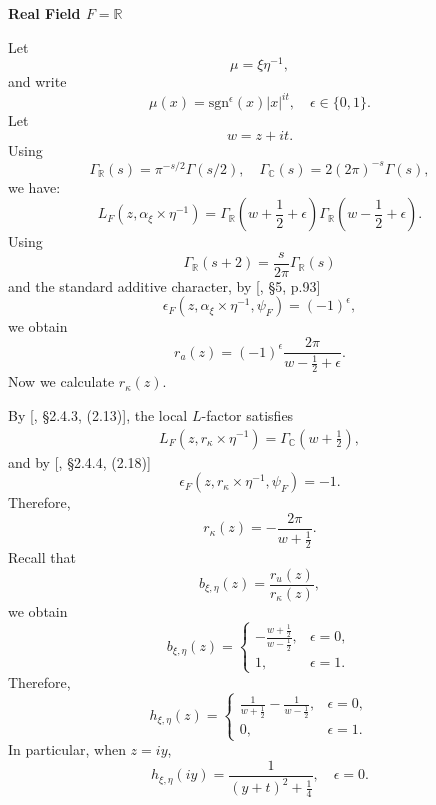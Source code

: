 \documentclass[11pt]{amsart}
\theoremstyle{definition}
\numberwithin{equation}{section}
\begin{document}
	\textbf{Real Field \(F = \mathbb{R}\)}
	
	Let
	\[
	\mu = \xi \eta^{-1},
	\]
	and write
	\[
	\mu(x) = \mathrm{sgn}^\epsilon(x)|x|^{it}, \quad \epsilon \in \{0, 1\}.
	\]
	Let
	\[
	w = z + it.
	\]
	Using
	\[
	\Gamma_\mathbb{R}(s) = \pi^{-s/2}\Gamma(s/2), \quad \Gamma_\mathbb{C}(s) = 2(2\pi)^{-s}\Gamma(s),
	\]
	we have:
	\[
	L_F(z, \alpha_\xi \times \eta^{-1}) = \Gamma_\mathbb{R}\left(w + \frac{1}{2} + \epsilon\right) \Gamma_\mathbb{R}\left(w - \frac{1}{2} + \epsilon\right).
	\]
	Using
	\[
	\Gamma_\mathbb{R}(s+2) = \frac{s}{2\pi} \Gamma_\mathbb{R}(s)
	\]
	and the standard additive character, by [\cite{JL70}, \S5, p.93] 
	\[
	\epsilon_F(z, \alpha_\xi \times \eta^{-1}, \psi_F) = (-1)^\epsilon,
	\]
	we obtain
	\begin{equation}
		r_a(z) = (-1)^\epsilon \frac{2\pi}{w - \frac{1}{2}+\epsilon}.
	\end{equation}
	Now we calculate \(r_\kappa(z)\).
	
	By [\cite{Hum25}, \S 2.4.3, (2.13)], the local \(L\)-factor satisfies
	\begin{align*}
		L_F(z, r_\kappa \times \eta^{-1}) = \Gamma_{\mathbb{C}}\left(w + \frac{1}{2}\right),
	\end{align*}
	and by [\cite{Hum25}, \S 2.4.4, (2.18)]
	\[
	\epsilon_F(z, r_\kappa \times \eta^{-1}, \psi_F) = -1.
	\]
	Therefore,
	\begin{equation*}
		r_\kappa(z) = -\frac{2\pi}{w + \frac{1}{2}}.
	\end{equation*}
	Recall that
	\[
	b_{\xi, \eta}(z) = \frac{r_u(z)}{r_\kappa(z)},
	\]
	we obtain
	\begin{equation*}
		b_{\xi, \eta}(z) = \begin{cases} 
			-\frac{w + \frac{1}{2}}{w - \frac{1}{2}}, & \epsilon = 0, \\ 
			1, & \epsilon = 1.
		\end{cases}
	\end{equation*}
	Therefore,
	\begin{equation*}
		h_{\xi, \eta}(z) = \begin{cases} 
			\frac{1}{w + \frac{1}{2}} - \frac{1}{w - \frac{1}{2}}, & \epsilon = 0, \\ 
			0, & \epsilon = 1.
		\end{cases}
	\end{equation*}
	In particular, when \(z = iy\),
	\begin{equation*}
		h_{\xi, \eta}(iy) = \frac{1}{(y + t)^2 + \frac{1}{4}}, \quad \epsilon = 0.
	\end{equation*}
	
\end{document}
